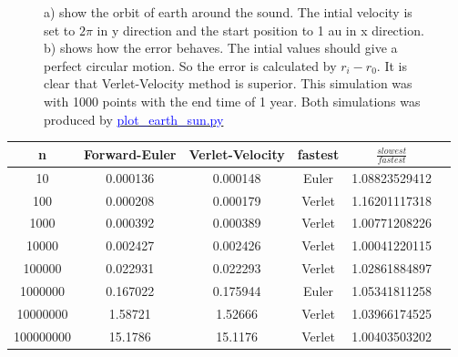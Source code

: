 \begin{figure}[H]
\begin{subfigure}{0.5\textwidth}
        \caption{}
    \end{subfigure}
    \caption{a) show the orbit of earth around the sound. The intial velocity is set to $2\pi$ in y direction and the start position to 1 au in x direction. b) shows how the error behaves. The intial values should give a perfect circular motion. So the error is calculated by $r_i - r_{0}$. It is clear that Verlet-Velocity method is superior. This simulation was with 1000 points with the end time of 1 year. Both simulations was produced by \href{https://github.com/erikfsk/Project-3/blob/master/Project3/3a/plot_earth_sun.py}{\textcolor{blue}{plot\_earth\_sun.py}}}
    \label{fig:earth-sun}
\end{figure}


\begin{center}
\label{table:euler-verlet-time}
\begin{tabular}{|c|c|c|c|c|c|}
    \hline 
    n & Forward-Euler & Verlet-Velocity &  fastest & $\frac{slowest}{fastest}$\\ 
    \hline
    10 & 0.000136 & 0.000148 & Euler &   1.08823529412   \\ 
    \hline 
    100 & 0.000208 & 0.000179 & Verlet &   1.16201117318   \\ 
    \hline 
    1000 & 0.000392 & 0.000389 & Verlet &  1.00771208226   \\ 
    \hline
    10000 & 0.002427 & 0.002426 & Verlet &   1.00041220115  \\ 
    \hline
    100000 & 0.022931 & 0.022293 & Verlet &   1.02861884897   \\ 
    \hline
    1000000 & 0.167022 & 0.175944 & Euler &   1.05341811258  \\ 
    \hline
    10000000 & 1.58721 & 1.52666 & Verlet &   1.03966174525  \\ 
    \hline
    100000000 & 15.1786 & 15.1176 & Verlet &   1.00403503202  \\ 
    \hline
\end{tabular}
\end{center}














